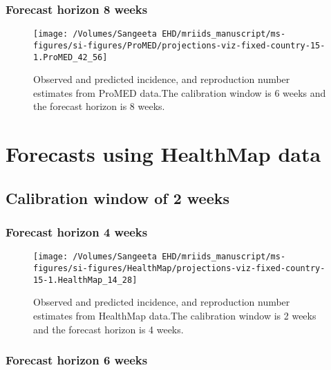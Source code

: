 \documentclass[11pt,]{article}
\begin{document}
\hypertarget{forecast-horizon-8-weeks-2}{%
  \subsubsection{Forecast horizon 8 weeks}\label{forecast-horizon-8-weeks-2}}

\begin{figure}
  {
    \centering \texttt{[image: /Volumes/Sangeeta EHD/mriids\_manuscript/ms-figures/si-figures/ProMED/projections-viz-fixed-country-15-1.ProMED\_42\_56]} 
  }
  \caption{Observed and predicted incidence, and reproduction number
    estimates from ProMED data.The calibration window is 6 weeks and
    the forecast horizon is 8 weeks.}
  \label{fig:pm68}
\end{figure}

\hypertarget{forecasts-using-healthmap-data}{%
  \section{Forecasts using HealthMap data}\label{forecasts-using-healthmap-data}}

\hypertarget{calibration-window-of-2-weeks-1}{%
  \subsection{Calibration window of 2 weeks}\label{calibration-window-of-2-weeks-1}}

\hypertarget{forecast-horizon-4-weeks-2}{%
  \subsubsection{Forecast horizon 4 weeks}\label{forecast-horizon-4-weeks-2}}

\begin{figure}
  {
    \centering \texttt{[image: /Volumes/Sangeeta EHD/mriids\_manuscript/ms-figures/si-figures/HealthMap/projections-viz-fixed-country-15-1.HealthMap\_14\_28]} 
  }
  \caption{Observed and predicted incidence, and reproduction number
    estimates from HealthMap data.The calibration window is 2 weeks
    and the forecast horizon is 4 weeks.}
  \label{fig:hm24}
\end{figure}

\hypertarget{forecast-horizon-6-weeks-3}{%
  \subsubsection{Forecast horizon 6 weeks}\label{forecast-horizon-6-weeks-3}}
\end{document}
